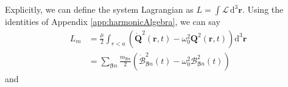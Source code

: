 \documentclass{article}
\begin{document}
Explicitly, we can define the system Lagrangian as $L = \int\mathcal{L}\,\mathrm{d}^3\mathbf{r}$. Using the identities of Appendix \ref{app:harmonicAlgebra}, we can say
\begin{equation}
\begin{split}
L_m &= \frac{\mu}{2}\int_{r<a}\left(\dot{\mathbf{Q}}^2(\mathbf{r},t) - \omega_0^2\mathbf{Q}^2(\mathbf{r},t)\right)\mathrm{d}^3\mathbf{r}\\
&= \sum_{\bm{\beta}n}\frac{m_{\bm{\beta}n}}{2}\left(\dot{\mathcal{B}}_{\bm{\beta}n}^2(t) - \omega_0^2\mathcal{B}_{\bm{\beta}n}^2(t)\right)
\end{split}
\end{equation}
and
\end{document}
